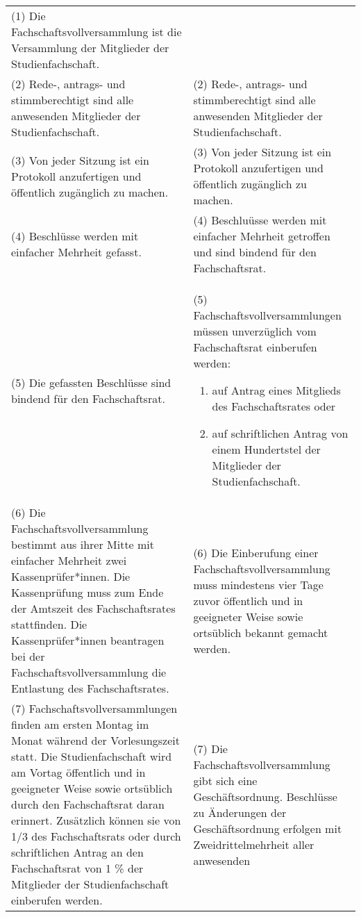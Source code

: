 {\begin{longtable}{|p{7.5cm}|p{7.5cm}|}
        (1) Die Fachschaftsvollversammlung ist die Versammlung der Mitglieder der Studienfachschaft.\\
        (2) Rede-, antrags- und stimmberechtigt sind alle anwesenden Mitglieder der Studienfachschaft.&
        (2) Rede-, antrags- und stimmberechtigt sind alle anwesenden Mitglieder der Studienfachschaft.\\
        (3) Von jeder Sitzung ist ein Protokoll anzufertigen und öffentlich zugänglich zu machen.&
        (3) Von jeder Sitzung ist ein Protokoll anzufertigen und öffentlich zugänglich zu machen.\\
        (4) Beschlüsse werden mit einfacher Mehrheit gefasst.&
        (4) Beschluüsse werden mit einfacher Mehrheit getroffen und sind bindend für den Fachschaftsrat.\\
        (5) Die gefassten Beschlüsse sind bindend für den Fachschaftsrat.&
        (5) Fachschaftsvollversammlungen müssen unverzüglich vom Fachschaftsrat einberufen werden:
        \begin{enumerate}
            \item auf Antrag eines Mitglieds des Fachschaftsrates oder
            \item auf schriftlichen Antrag von einem Hundertstel der Mitglieder der
            Studienfachschaft.
        \end{enumerate}\\
        (6) Die Fachschaftsvollversammlung bestimmt aus ihrer Mitte mit einfacher Mehrheit
        zwei Kassenprüfer*innen. Die Kassenprüfung muss zum Ende der Amtszeit des Fachschaftsrates
        stattfinden. Die Kassenprüfer*innen beantragen bei der Fachschaftsvollversammlung die Entlastung
        des Fachschaftsrates.&
        (6) Die Einberufung einer Fachschaftsvollversammlung muss mindestens vier Tage zuvor öffentlich und
        in geeigneter Weise sowie ortsüblich bekannt gemacht werden.\\
        (7) Fachschaftsvollversammlungen finden am ersten Montag im Monat während der Vorlesungszeit statt.
        Die Studienfachschaft wird am Vortag öffentlich und in geeigneter Weise sowie ortsüblich durch den
        Fachschaftsrat daran erinnert. Zusätzlich können sie von 1/3 des Fachschaftsrats oder durch schriftlichen
        Antrag an den Fachschaftsrat von 1 \% der Mitglieder der Studienfachschaft einberufen werden.&
        (7) Die Fachschaftsvollversammlung gibt sich eine Geschäftsordnung. Beschlüsse zu
        Änderungen der Geschäftsordnung erfolgen mit Zweidrittelmehrheit aller anwesenden

\end{longtable}}
